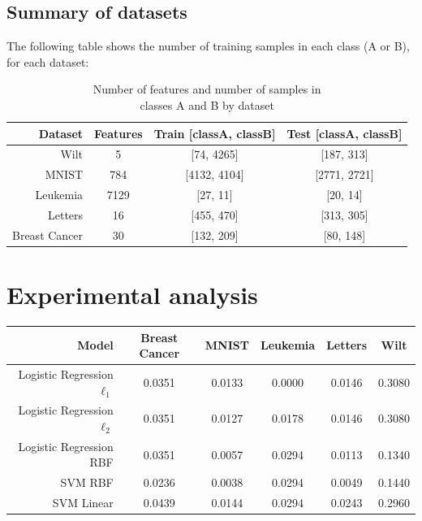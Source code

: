 \documentclass[letterpaper, 11pt]{article}
\begin{document}
\subsection{Summary of datasets}

The following table shows the number of training samples in each class (A or B), for each dataset:

\begin{table}[h]
  \centering
  \begin{tabular}{r|c c c}
    Dataset       & Features & Train [classA, classB] & Test [classA, classB] \\
    \hline
    Wilt          & 5        & [74, 4265]             & [187, 313] \\
    MNIST         & 784      & [4132, 4104]           & [2771, 2721] \\
    Leukemia      & 7129     & [27, 11]               & [20, 14] \\
    Letters       & 16       & [455, 470]             & [313, 305] \\
    Breast Cancer & 30       & [132, 209]             & [80, 148]
\end{tabular}
  \caption{Number of features and number of samples in \\classes A and B by dataset}
\end{table}

\section{Experimental analysis}
\begin{center}
  \begin{tabular}{r|c c c c c}
     Model & Breast Cancer & MNIST & Leukemia & Letters & Wilt \\
     \hline
      Logistic Regression $\ell_1$ & 0.0351 & 0.0133 & 0.0000 & 0.0146 & 0.3080 \\
      Logistic Regression $\ell_2$ & 0.0351 & 0.0127 & 0.0178 & 0.0146 & 0.3080 \\
      Logistic Regression RBF      & 0.0351 & 0.0057 & 0.0294 & 0.0113 & 0.1340 \\
      SVM RBF                      & 0.0236 & 0.0038 & 0.0294 & 0.0049 & 0.1440 \\
      SVM Linear                   & 0.0439 & 0.0144 & 0.0294 & 0.0243 & 0.2960 \\
\end{tabular}
\end{center}
\end{document}
